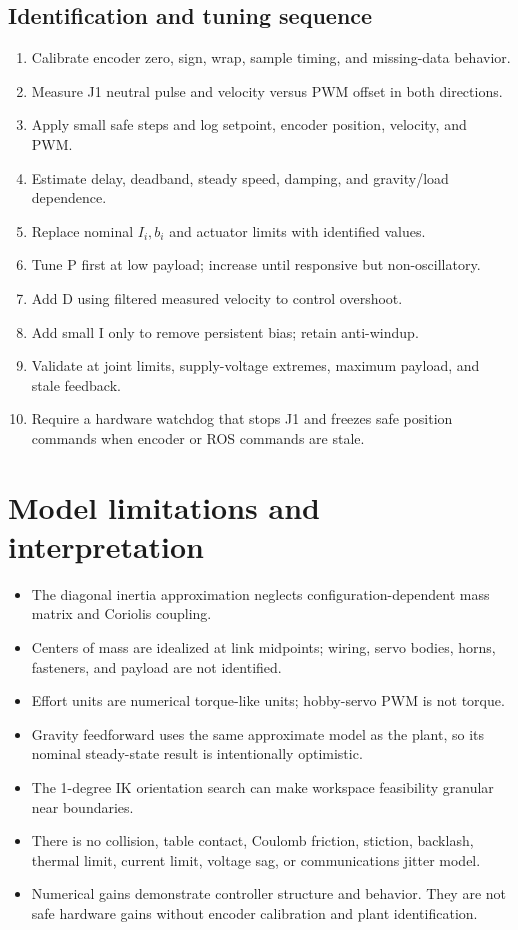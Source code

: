\documentclass[11pt,a4paper]{article}
\begin{document}
\subsection{Identification and tuning sequence}
\begin{enumerate}
\item Calibrate encoder zero, sign, wrap, sample timing, and missing-data behavior.
\item Measure J1 neutral pulse and velocity versus PWM offset in both directions.
\item Apply small safe steps and log setpoint, encoder position, velocity, and PWM.
\item Estimate delay, deadband, steady speed, damping, and gravity/load dependence.
\item Replace nominal $I_i,b_i$ and actuator limits with identified values.
\item Tune P first at low payload; increase until responsive but non-oscillatory.
\item Add D using filtered measured velocity to control overshoot.
\item Add small I only to remove persistent bias; retain anti-windup.
\item Validate at joint limits, supply-voltage extremes, maximum payload, and stale feedback.
\item Require a hardware watchdog that stops J1 and freezes safe position commands when
encoder or ROS commands are stale.
\end{enumerate}

\section{Model limitations and interpretation}
\begin{itemize}
\item The diagonal inertia approximation neglects configuration-dependent mass
matrix and Coriolis coupling.
\item Centers of mass are idealized at link midpoints; wiring, servo bodies,
horns, fasteners, and payload are not identified.
\item Effort units are numerical torque-like units; hobby-servo PWM is not torque.
\item Gravity feedforward uses the same approximate model as the plant, so its
nominal steady-state result is intentionally optimistic.
\item The 1-degree IK orientation search can make workspace feasibility granular
near boundaries.
\item There is no collision, table contact, Coulomb friction, stiction, backlash,
thermal limit, current limit, voltage sag, or communications jitter model.
\item Numerical gains demonstrate controller structure and behavior. They are not
safe hardware gains without encoder calibration and plant identification.
\end{itemize}
\end{document}
